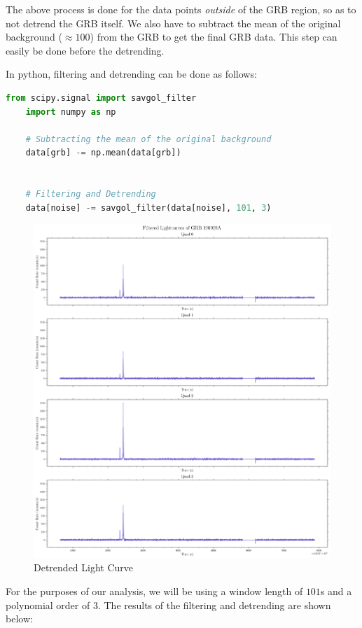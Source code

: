 \documentclass[11pt]{book} %
\begin{document}
The above process is done for the data points \textit{outside} of the GRB region, so as to not detrend the GRB itself. We also have to subtract the mean of the original background ($\approx 100$) from the GRB to get the final GRB data. This step can easily be done before the detrending.

In python, filtering and detrending can be done as follows:

\begin{lstlisting}[language=Python]
    from scipy.signal import savgol_filter
    import numpy as np

    # Subtracting the mean of the original background
    data[grb] -= np.mean(data[grb])


    # Filtering and Detrending
    data[noise] -= savgol_filter(data[noise], 101, 3)
\end{lstlisting}

\begin{figure}
    \centering
    \includegraphics[scale=0.25]{Pictures/detrended.png}
    \caption{Detrended Light Curve}
\end{figure}


For the purposes of our analysis, we will be using a window length of $101$s and a polynomial order of $3$. The results of the filtering and detrending are shown below:
\end{document}
